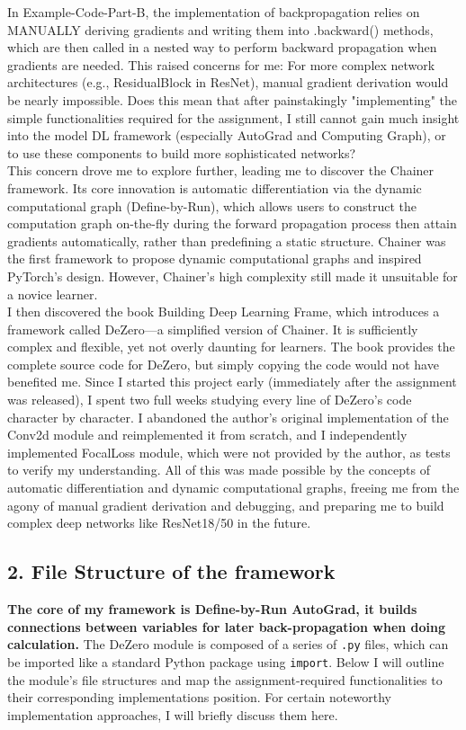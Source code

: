 \documentclass{article}
\newcommand{\subs}[1]{\subsection*{#1}}
\begin{document}
In Example-Code-Part-B, the implementation of backpropagation relies on MANUALLY deriving gradients and writing them into .backward() methods, which are then called in a nested way to perform backward propagation when gradients are needed. This raised concerns for me: For more complex network architectures (e.g., ResidualBlock in ResNet), manual gradient derivation would be nearly impossible. Does this mean that after painstakingly "implementing" the simple functionalities required for the assignment, I still cannot gain much insight into the model DL framework (especially AutoGrad and Computing Graph), or to use these components to build more sophisticated networks?\\

This concern drove me to explore further, leading me to discover the Chainer framework. Its core innovation is automatic differentiation via the dynamic computational graph (Define-by-Run), which allows users to construct the computation graph on-the-fly during the forward propagation process then attain gradients automatically, rather than predefining a static structure. Chainer was the first framework to propose dynamic computational graphs and inspired PyTorch's design. However, Chainer's high complexity still made it unsuitable for a novice learner.\\

I then discovered the book Building Deep Learning Frame, which introduces a framework called DeZero—a simplified version of Chainer. It is sufficiently complex and flexible, yet not overly daunting for learners. The book provides the complete source code for DeZero, but simply copying the code would not have benefited me. Since I started this project early (immediately after the assignment was released), I spent two full weeks studying every line of DeZero's code character by character. I abandoned the author’s original implementation of the Conv2d module and reimplemented it from scratch, and I independently implemented FocalLoss module, which were not provided by the author, as tests to verify my understanding. All of this was made possible by the concepts of automatic differentiation and dynamic computational graphs, freeing me from the agony of manual gradient derivation and debugging, and preparing me to build complex deep networks like ResNet18/50 in the future.

\subs{2. File Structure of the framework}
\textbf{The core of my framework is Define-by-Run AutoGrad, it builds connections between variables for later back-propagation when doing calculation.} The DeZero module is composed of a series of \texttt{.py} files, which can be imported like a standard Python package using \texttt{import}. Below I will outline the module's file structures and map the assignment-required functionalities to their corresponding implementations position. For certain noteworthy implementation approaches, I will briefly discuss them here.
\end{document}
